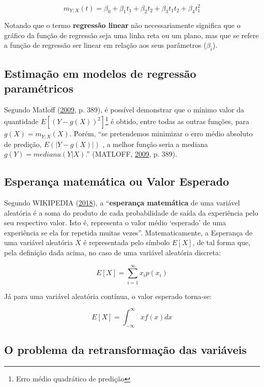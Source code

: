 \documentclass[a4paper]{article}
\let\rmarkdownfootnote\footnote%
\def\footnote{\protect\rmarkdownfootnote}
\begin{document}
\[m_{Y;X}(t) = \beta_0 + \beta_1t_1 + \beta_2t_2 + \beta_3t_1t_2 + \beta_4t_1^2\]

Notando que o termo \textbf{regressão linear} não necessariamente
significa que o gráfico da função de regressão seja uma linha reta ou um
plano, mas que se refere a função de regressão ser linear em relação aos
seus parâmetros (\(\beta_i\)).

\subsection{Estimação em modelos de regressão
paramétricos}\label{estimacao-em-modelos-de-regressao-parametricos}

Segundo Matloff (\protect\hyperlink{ref-matloff2009}{2009}, p. 389), é
possível demonstrar que o mínimo valor da quantidade
\(E[(Y - g(X))^2]\)\footnote{Erro médio quadrático de predição} é
obtido, entre todas as outras funções, para \(g(X) = m_{Y;X}(X)\).
Porém, ``se pretendemos minimizar o erro médio absoluto de predição,
\(E(|Y - g(X)|)\) , a melhor função seria a mediana
\(g(Y) = mediana(Y|X)\).'' (MATLOFF,
\protect\hyperlink{ref-matloff2009}{2009}, p. 389).

\subsection{Esperança matemática ou Valor
Esperado}\label{esperanca-matematica-ou-valor-esperado}

Segundo WIKIPEDIA (\protect\hyperlink{ref-wiki:E}{2018}), a
``\textbf{esperança matemática} de uma variável aleatória é a soma do
produto de cada probabilidade de saída da experiência pelo seu
respectivo valor. Isto é, representa o valor médio `esperado' de uma
experiência se ela for repetida muitas vezes''. Matematicamente, a
Esperança de uma variável aleatória \(X\) é representada pelo símbolo
\(E[X]\), de tal forma que, pela definição dada acima, no caso de uma
variável aleatória discreta:

\[E[X] = \sum_{i = 1}^{\infty}x_ip(x_i)\]

Já para uma variável aleatória contínua, o valor esperado torna-se:

\[E[X] = \int_{-\infty}^{\infty}xf(x)dx\]

\subsection{O problema da retransformação das
variáveis}\label{o-problema-da-retransformacao-das-variaveis}
\end{document}
